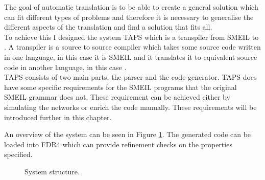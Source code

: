 The goal of automatic translation is to be able to create a general solution which can fit different types of problems and therefore it is necessary to generalise the different aspects of the translation and find a solution that fits all.\\
To achieve this I designed the system TAPS which is a transpiler from SMEIL to \cspm{}. A transpiler is a source to source compiler which takes some source code written in one language, in this case it is SMEIL and it translates it to equivalent source code in another language, in this case \cspm{}.\\

TAPS consists of two main parts, the parser and the code generator. TAPS does have some specific requirements for the SMEIL programs that the original SMEIL grammar does not. These requirement can be achieved either by simulating the networks or enrich the code manually. These requirements will be introduced further in this chapter.

An overview of the system can be seen in Figure \ref{fig:TAPS_network}. The generated \cspm{} code can be loaded into FDR4 which can provide refinement checks on the properties specified.
\begin{figure}[!ht]
  \centering
  \caption{System structure.}
  \label{fig:TAPS_network}
\end{figure}

